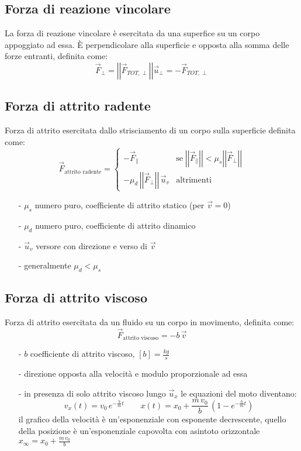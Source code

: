 \documentclass[a4paper]{article}
\newcommand\ux{\vec{u}_x}
\newcommand\uv{\vec{u}_v}
\newcommand\uper{\vec{u}_\perp}
\newcommand\vmod[1]{\left|\left|{#1}\right|\right|}
\begin{document}
\subsection{Forza di reazione vincolare}
La forza di reazione vincolare è esercitata da una superfice su un corpo appoggiato ad essa. È perpendicolare alla superficie e
opposta alla somma delle forze entranti, definita come:
\[\vec{F}_\perp = \vmod{\vec{F}_{TOT,\perp}} \uper = -\vec{F}_{TOT,\perp}\]

\subsection{Forza di attrito radente}
Forza di attrito esercitata dallo strisciamento di un corpo sulla superficie definita come:
\[\vec{F}_\text{attrito radente} = \begin{cases}
	-\vec{F}_{\parallel} &\text{se} \; \vmod{\vec{F}_\parallel} < \mu_s \vmod{\vec{F}_\perp}\\
	-\mu_d \, \vmod{\vec{F}_\perp} \, \uv &\text{altrimenti}
\end{cases}\]

\begin{itemize}[topsep=3pt, itemsep=0pt]
	\item[-] \(\mu_s\) numero puro, coefficiente di attrito statico (per \(\vec{v}=0\))
	\item[-] \(\mu_d\) numero puro, coefficiente di attrito dinamico
	\item[-] \(\uv\) versore con direzione e verso di \(\vec{v}\)
	\item[-] generalmente \(\mu_d < \mu_s\)
\end{itemize}

\subsection{Forza di attrito viscoso}
Forza di attrito esercitata da un fluido su un corpo in movimento, definita come:
\[\vec{F}_\text{attrito viscoso} = - b \, \vec{v}\]
\begin{itemize}[topsep=3pt, itemsep=0pt]
	\item[-] \(b\) coefficiente di attrito viscoso, \(\left[b\right] = \frac{kg}{s}\)
	\item[-] direzione opposta alla velocità e modulo proporzionale ad essa
	\item[-] in presenza di solo attrito viscoso lungo \(\ux\) le equazioni del moto diventano:
	\[v_x(t) = v_0 \, e^{-\frac{b}{m}t} \qquad x(t) = x_0 + \frac{m \, v_0}{b} \, \left(1-e^{-\frac{b}{m}t}\right)\]
	il grafico della velocità è un'esponenziale con esponente decrescente, quello della posizione è un'esponenziale capovolta con asintoto orizzontale \(x_{\infty} = x_0 + \frac{m \, v_0}{b}\)
\end{itemize}
\end{document}

